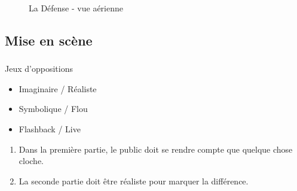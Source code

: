 	\begin{frame}
	\frametitle{\insertsubsection}
	
		\begin{figure}
		\centering
		\caption{La Défense - vue aérienne}
		\end{figure}
	
	\end{frame}
	
	\subsection{Mise en scène}

	\begin{frame}
	\frametitle{\insertsubsection}
	
		\begin{block}{Jeux d'oppositions}
			\begin{itemize}
			\item Imaginaire / Réaliste
			\item Symbolique / Flou
			\item Flashback / Live
			\end{itemize}
		\end{block}
		
		\begin{enumerate}
		\item Dans la première partie, le public doit se rendre compte que 
			quelque chose cloche.
		\item La seconde partie doit être réaliste pour marquer la différence.
		\end{enumerate}
	
	\end{frame}